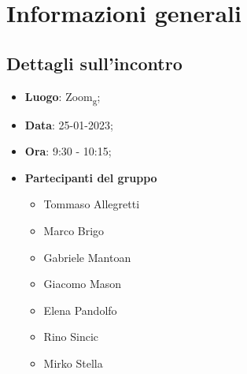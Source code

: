 \section{Informazioni generali}

\subsection{Dettagli sull'incontro}
\begin{itemize}
    \item \textbf{Luogo}: Zoom\textsubscript{g};
    \item \textbf{Data}: 25-01-2023;
    \item \textbf{Ora}: 9:30 - 10:15;
    \item \textbf{Partecipanti del gruppo}
        \begin{itemize}
            \item Tommaso Allegretti
            \item Marco Brigo
            \item Gabriele Mantoan
            \item Giacomo Mason
            \item Elena Pandolfo
            \item Rino Sincic
            \item Mirko Stella
        \end{itemize}
\end{itemize}

